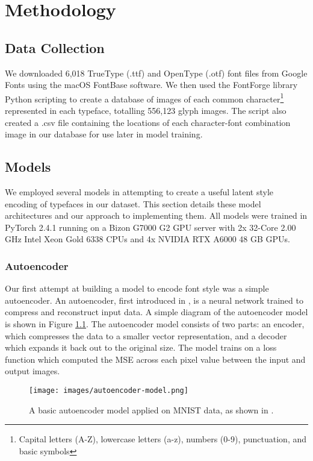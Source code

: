 \chapter{Methodology}
\label{chap:methodology}

\section{Data Collection}

We downloaded 6,018 TrueType (.ttf) and OpenType (.otf) font files from Google Fonts using the macOS FontBase software. We then used the FontForge library Python scripting to create a database of images of each common character\footnote{Capital letters (A-Z), lowercase letters (a-z), numbers (0-9), punctuation, and basic symbols} represented in each typeface, totalling 556,123 glyph images. The script also created a .csv file containing the locations of each character-font combination image in our database for use later in model training.

\section{Models}

We employed several models in attempting to create a useful latent style encoding of  typefaces in our dataset. This section details these model architectures and our approach to implementing them. All models were trained in PyTorch 2.4.1 running on a Bizon G7000 G2 GPU server with 2x 32-Core 2.00 GHz Intel Xeon Gold 6338 CPUs and 4x NVIDIA RTX A6000 48 GB GPUs.

\subsection{Autoencoder}

Our first attempt at building a model to encode font style was a simple autoencoder. An autoencoder, first introduced in \cite{rumelhart1986}, is a neural network trained to compress and reconstruct input data. A simple diagram of the autoencoder model is shown in Figure \ref{fig:autoencoder-model}. The autoencoder model consists of two parts: an encoder, which compresses the data to a smaller vector representation, and a decoder which expands it back out to the original size. The model trains on a loss function which computed the MSE across each pixel value between the input and output images.

\begin{figure}[h]
    \centering
    \texttt{[image: images/autoencoder-model.png]}
    \caption{A basic autoencoder model applied on MNIST data, as shown in \cite{rumelhart1986}.}
    \label{fig:autoencoder-model}
\end{figure}

